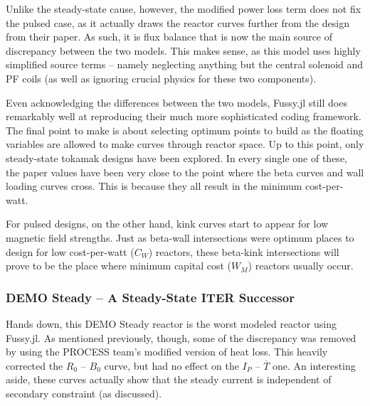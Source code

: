 Unlike the steady-state cause, however, the modified power loss term does not fix the pulsed case, as it actually draws the reactor curves further from the design from their paper. As such, it is flux balance that is now the main source of discrepancy between the two models. This makes sense, as this model uses highly simplified source terms -- namely neglecting anything but the central solenoid and PF coils (as well as ignoring crucial physics for these two components).

Even acknowledging the differences between the two models, Fussy.jl still does remarkably well at reproducing their much more sophisticated coding framework. The final point to make is about selecting optimum points to build as the floating variables are allowed to make curves through reactor space. Up to this point, only steady-state tokamak designs have been explored. In every single one of these, the paper values have been very close to the point where the beta curves and wall loading curves cross. This is because they all result in the minimum cost-per-watt. 

For pulsed designs, on the other hand, kink curves start to appear for low magnetic field strengths. Just as beta-wall intersections were optimum places to design for low cost-per-watt ($C_W$) reactors, these beta-kink intersections will prove to be the place where minimum capital cost ($W_M$) reactors usually occur.

\newpage 

\subsubsection{DEMO Steady -- A Steady-State ITER Successor}

Hands down, this DEMO Steady reactor is the worst modeled reactor using Fussy.jl. As mentioned previously, though, some of the discrepancy was removed by using the PROCESS team's modified version of heat loss. This heavily corrected the $R_0$ -- $B_0$ curve, but had no effect on the $I_P$ -- $\overline T$ one. An interesting aside, these curves actually show that the steady current is independent of secondary constraint (as discussed).

